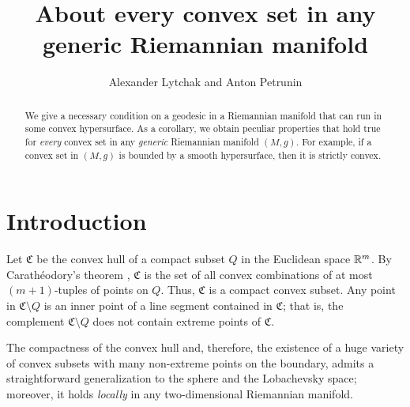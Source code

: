 \documentclass[a4paper,10pt]{article}
\def\thetitle{About every convex set in any\\ generic Riemannian manifold}
\begin{document}

\title{\thetitle}
\author{Alexander Lytchak and Anton Petrunin}
\date{}
\maketitle

\begin{abstract}
We give a necessary condition on a geodesic in a Riemannian manifold that can run in some convex hypersurface.
As a corollary, we obtain peculiar properties that hold true for \emph{every} convex set in any \emph{generic} Riemannian manifold $(M,g)$.
For example, if a convex set in $(M,g)$ is bounded by a smooth hypersurface, then it is strictly convex.
\end{abstract}








\section{Introduction}
Let $\mathfrak{C}$ be the convex hull of a compact subset $Q$ in the Euclidean space $\mathbb{R}^m$.
By Carathéodory's theorem \cite{Handbook}, $\mathfrak{C}$ is the set of all convex combinations of at most $(m+1)$-tuples of points on $Q$.
Thus, $\mathfrak{C}$ is a compact convex subset.  Any point in $\mathfrak{C}\setminus Q$ is an inner point of a line segment contained in $\mathfrak{C}$;
that is, the complement $\mathfrak{C} \setminus Q$ does not contain extreme points of $\mathfrak{C}$. 

The compactness of the convex hull and, therefore, the existence of a huge variety of convex subsets with many non-extreme points on the boundary, admits a straightforward generalization to the sphere and the  Lobachevsky space; moreover, it 
holds \emph{locally} in any two-dimensional Riemannian manifold.
\end{document}
